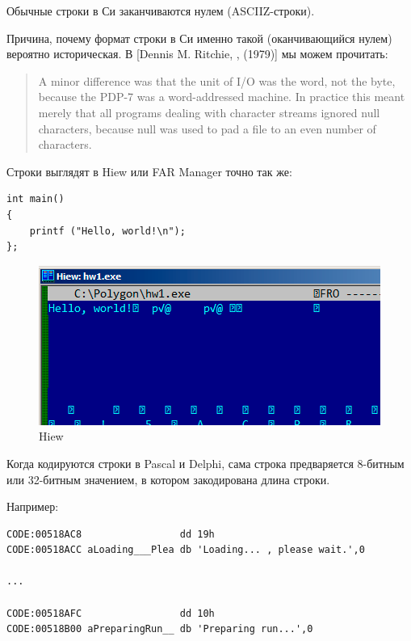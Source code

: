 
\subsectionold{\CCpp}

\label{C_strings}
Обычные строки в Си заканчиваются нулем (\ac{ASCIIZ}-строки).

Причина, почему формат строки в Си именно такой (оканчивающийся нулем) вероятно историческая.
В [Dennis M. Ritchie, , (1979)]
мы можем прочитать:

\begin{framed}
\begin{quotation}
A minor difference was that the unit of I/O was the word, not the byte, because the PDP-7 was a word-addressed
machine. In practice this meant merely that all programs dealing with character streams ignored null
characters, because null was used to pad a file to an even number of characters.
\end{quotation}
\end{framed}

Строки выглядят в Hiew или FAR Manager точно так же:

\begin{lstlisting}
int main()
{
	printf ("Hello, world!\n");
};
\end{lstlisting}

\begin{figure}[H]
\centering
\includegraphics[scale=\NormalScale]{digging_into_code/strings/C-string.png}
\caption{Hiew}
\end{figure}


Когда кодируются строки в Pascal и Delphi, сама строка предваряется 8-битным или 32-битным значением, в котором закодирована длина строки.

Например:

\begin{lstlisting}[caption=Delphi]
CODE:00518AC8                 dd 19h
CODE:00518ACC aLoading___Plea db 'Loading... , please wait.',0

...

CODE:00518AFC                 dd 10h
CODE:00518B00 aPreparingRun__ db 'Preparing run...',0
\end{lstlisting}

